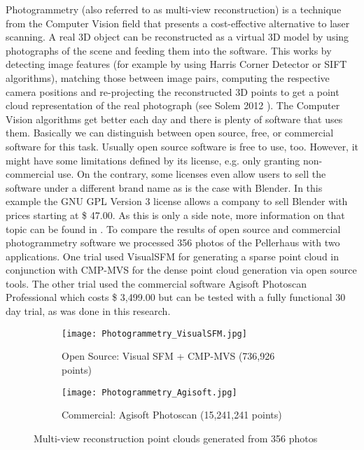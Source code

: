 Photogrammetry (also referred to as multi-view reconstruction) is a technique from the Computer Vision field that presents a cost-effective alternative to laser scanning. A real 3D object can be reconstructed as a virtual 3D model by using photographs of the scene and feeding them into the software. This works by detecting image features (for example by using Harris Corner Detector or SIFT algorithms), matching those between image pairs, computing the respective camera positions and re-projecting the reconstructed 3D points to get a point cloud representation of the real photograph (see Solem 2012 \parencite[][p29]{bookProgrammingComputerVisionwithPython}).
The Computer Vision algorithms get better each day and there is plenty of software that uses them. Basically we can distinguish between open source, free, or commercial software for this task. Usually open source software is free to use, too. However, it might have some limitations defined by its license, e.g. only granting non-commercial use. On the contrary, some licenses even allow users to sell the software under a different brand name as is the case with Blender. In this example the GNU GPL Version 3 license allows a company to sell Blender with prices starting at \$ 47.00. As this is only a side note, more information on that topic can be found in \parencite{blender_rebranding}.
To compare the results of open source and commercial photogrammetry software we processed 356 photos of the Pellerhaus with two applications. One trial used VisualSFM for generating a sparse point cloud in conjunction with CMP-MVS for the dense point cloud generation via open source tools. The other trial used the commercial software Agisoft Photoscan Professional which costs \$ 3,499.00 but can be tested with a fully functional 30 day trial, as was done in this research.

\begin{figure}[h]
	\centering
	\begin{subfigure}[b]{0.8\textwidth}
		\centering
		\texttt{[image: Photogrammetry\_VisualSFM.jpg]}
		\caption{Open Source: Visual SFM + CMP-MVS (736,926 points)}
		\label{fig:visualsfm}
	\end{subfigure}
	\hfill
	\begin{subfigure}[b]{0.8\textwidth}
		\centering
		\texttt{[image: Photogrammetry\_Agisoft.jpg]}
		\caption{Commercial: Agisoft Photoscan (15,241,241 points)}
		\label{fig:photoscan}
	\end{subfigure}
	\caption{Multi-view reconstruction point clouds generated from 356 photos}
	\label{fig:multiview reconstruction pellerhaus}
\end{figure}

